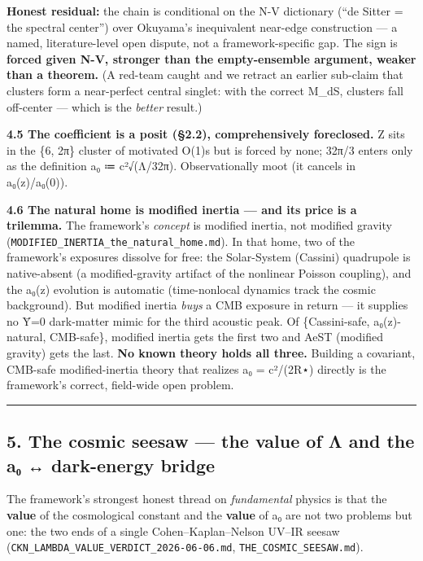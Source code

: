\documentclass[
]{article}
\newcounter{none} %
\begin{document}
\textbf{Honest residual:} the chain is conditional on the N-V dictionary
(``de Sitter = the spectral center'') over Okuyama's inequivalent
near-edge construction --- a named, literature-level open dispute, not a
framework-specific gap. The sign is \textbf{forced given N-V, stronger
than the empty-ensemble argument, weaker than a theorem.} (A red-team
caught and we retract an earlier sub-claim that clusters form a
near-perfect central singlet: with the correct M\_dS, clusters fall
off-center --- which is the \emph{better} result.)

\textbf{4.5 The coefficient is a posit (§2.2), comprehensively
foreclosed.} Z sits in the \{6, 2π\} cluster of motivated O(1)s but is
forced by none; 32π/3 enters only as the definition a₀ ≔ c²√(Λ/32π).
Observationally moot (it cancels in a₀(z)/a₀(0)).

\textbf{4.6 The natural home is modified inertia --- and its price is a
trilemma.} The framework's \emph{concept} is modified inertia, not
modified gravity (\texttt{MODIFIED\_INERTIA\_the\_natural\_home.md}). In
that home, two of the framework's exposures dissolve for free: the
Solar-System (Cassini) quadrupole is native-absent (a modified-gravity
artifact of the nonlinear Poisson coupling), and the a₀(z) evolution is
automatic (time-nonlocal dynamics track the cosmic background). But
modified inertia \emph{buys} a CMB exposure in return --- it supplies no
Ȳ=0 dark-matter mimic for the third acoustic peak. Of \{Cassini-safe,
a₀(z)-natural, CMB-safe\}, modified inertia gets the first two and AeST
(modified gravity) gets the last. \textbf{No known theory holds all
three.} Building a covariant, CMB-safe modified-inertia theory that
realizes a₀ = c²/(2R⋆) directly is the framework's correct, field-wide
open problem.

\begin{center}\rule{0.5\linewidth}{0.5pt}\end{center}

\subsection{5. The cosmic seesaw --- the value of Λ and the a₀ ↔
dark-energy
bridge}\label{the-cosmic-seesaw-the-value-of-ux3bb-and-the-aux2080-dark-energy-bridge}

The framework's strongest honest thread on \emph{fundamental} physics is
that the \textbf{value} of the cosmological constant and the
\textbf{value} of a₀ are not two problems but one: the two ends of a
single Cohen--Kaplan--Nelson UV--IR seesaw
(\texttt{CKN\_LAMBDA\_VALUE\_VERDICT\_2026-06-06.md},
\texttt{THE\_COSMIC\_SEESAW.md}).
\end{document}
